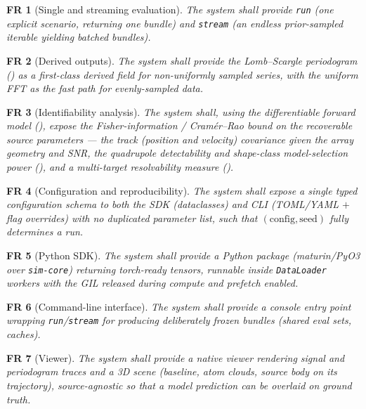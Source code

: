 \documentclass[11pt,a4paper]{article}
\theoremstyle{reqstyle}
\newtheorem{freq}{FR}
\begin{document}
\begin{freq}[Single and streaming evaluation]
The system shall provide \texttt{run} (one explicit scenario, returning one bundle) and
\texttt{stream} (an endless prior-sampled iterable yielding batched bundles).
\end{freq}

\begin{freq}[Derived outputs]
The system shall provide the Lomb--Scargle periodogram () as a first-class
derived field for non-uniformly sampled series, with the uniform FFT as the fast path for
evenly-sampled data.
\end{freq}

\begin{freq}[Identifiability analysis]
The system shall, using the differentiable forward model (), expose the
Fisher-information / Cram\'er--Rao bound on the recoverable source parameters --- the track
(position and velocity) covariance given the array geometry and SNR, the quadrupole
detectability and shape-class model-selection power (), and a multi-target
resolvability measure ().
\end{freq}

\begin{freq}[Configuration and reproducibility]
The system shall expose a single typed configuration schema to both the SDK (dataclasses)
and CLI (TOML/YAML $+$ flag overrides) with no duplicated parameter list, such that
$(\text{config},\text{seed})$ fully determines a run.
\end{freq}

\begin{freq}[Python SDK]
The system shall provide a Python package (maturin/PyO3 over \texttt{sim-core}) returning
torch-ready tensors, runnable inside \texttt{DataLoader} workers with the GIL released
during compute and prefetch enabled.
\end{freq}

\begin{freq}[Command-line interface]
The system shall provide a console entry point wrapping \texttt{run}/\texttt{stream} for
producing deliberately frozen bundles (shared eval sets, caches).
\end{freq}

\begin{freq}[Viewer]
The system shall provide a native viewer rendering signal and periodogram traces and a 3D
scene (baseline, atom clouds, source body on its trajectory), source-agnostic so that a
model prediction can be overlaid on ground truth.
\end{freq}
\end{document}
